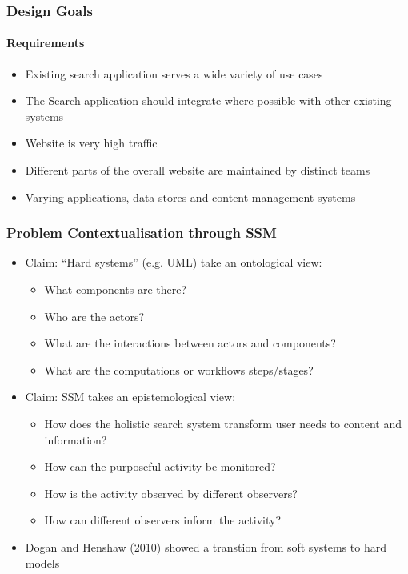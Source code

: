 \documentclass{beamer}
\begin{document}
\begin{frame}
  \frametitle{Design Goals}
  \framesubtitle{Requirements}
  \begin{itemize}
    \pause \item Existing search application serves a wide variety of use cases
    \pause \item The Search application should integrate where possible with other existing systems
    \pause \item Website is very high traffic
    \pause \item Different parts of the overall website are maintained by distinct teams
    \pause \item Varying applications, data stores and content management systems
  \end{itemize}
\end{frame}

\begin{frame}
  \frametitle{Problem Contextualisation through SSM}
  \begin{itemize}
    \pause \item Claim: ``Hard systems'' (e.g. UML) take an ontological view:
    \begin{itemize}
      \pause \item What components are there?
      \pause \item Who are the actors?
      \pause \item What are the interactions between actors and components?
      \pause \item What are the computations or workflows steps/stages?
    \end{itemize}
    \pause \item Claim: SSM takes an epistemological view:
    \begin{itemize}
      \pause \item How does the holistic search system transform user needs to content and information?
      \pause \item How can the purposeful activity be monitored?
      \pause \item How is the activity observed by different observers?
      \pause \item How can different observers inform the activity?
    \end{itemize}
    \pause \item Dogan and Henshaw (2010) showed a transtion from soft systems to hard models
  \end{itemize}
\end{frame}
\end{document}
